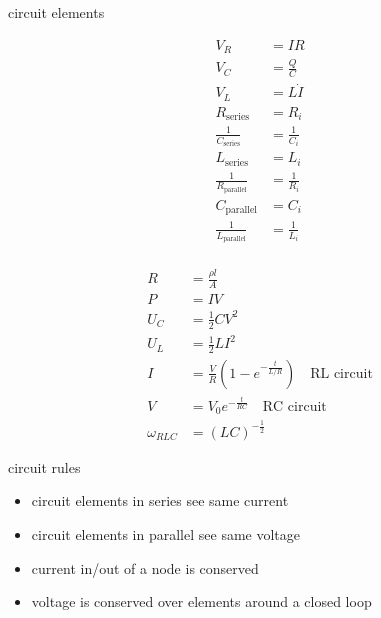 \documentclass[avery5388, frame]{flashcards}
\begin{document}
\begin{flashcard}{circuit elements}
  {
    \vspace{-0.5cm}
    \begin{multicols}{2}
    \begin{align*}
      V_{R} &= IR\\
      V_{C} &= \frac{Q}{C}\\
      V_{L} &= L\dot{I}\\
      R_{\textrm{series}} &= R_{i}\\
      \frac{1}{C_{\textrm{series}}} &= \frac{1}{C_{i}}\\
      L_{\textrm{series}} &= L_{i}\\
      \frac{1}{R_{\textrm{parallel}}} &= \frac{1}{R_{i}}\\
      C_{\textrm{parallel}} &= C_{i}\\
      \frac{1}{L_{\textrm{parallel}}} &= \frac{1}{L_{i}}\\
    \end{align*}

    \begin{align*}
      R &= \frac{\rho l}{A}\\
      P &= IV\\
      U_{C} &= \frac{1}{2} C V^{2}\\
      U_{L} &= \frac{1}{2} L I^{2}\\
      I &= \frac{V}{R}(1 - e^{-\frac{t}{L/R}}) \quad \textrm{RL circuit}\\
      V &= V_{0}e^{-\frac{t}{RC}} \quad \textrm{RC circuit}\\
      \omega_{RLC} &= (L C)^{-\frac{1}{2}}
    \end{align*}
    \end{multicols}
  }
\end{flashcard}

\begin{flashcard}{circuit rules}
  {
    \begin{itemize}
    \item circuit elements in series see same current
    \item circuit elements in parallel see same voltage
    \item current in/out of a node is conserved
    \item voltage is conserved over elements around a closed loop
    \end{itemize}
  }
\end{flashcard}
\end{document}
